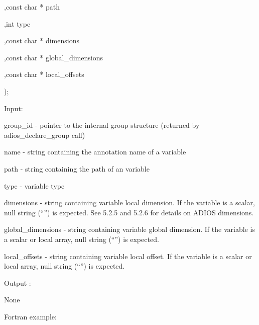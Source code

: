 \vspace{10pt}
\parindent=122pt
,const char * path

\vspace{10pt}
\parindent=151pt
,int type

\vspace{10pt}
,const char * dimensions

\vspace{10pt}
\parindent=302pt
,const char * global\_dimensions

\vspace{10pt}
\parindent=151pt
,const char * local\_offsets

\vspace{10pt}
);

\vspace{10pt}
Input: 

\vspace{10pt}
\leftskip=40pt
\parindent=0pt
group\_id - pointer to the internal group structure (returned by adios\_declare\_group 
call)

\vspace{10pt}
name - string containing the annotation name of a variable

\vspace{10pt}
path - string containing the path of an variable 

\vspace{10pt}
type - variable type 

\vspace{10pt}
dimensions - string containing variable local dimension. If the variable is a scalar, 
null string (``'') is expected. See 5.2.5 and 5.2.6 for details on ADIOS dimensions.

\vspace{10pt}
global\_dimensions - string containing variable global dimension. If the variable 
is a scalar or local array, null string (``'') is expected.

\vspace{10pt}
local\_offsets - string containing variable local offset. If the variable is a 
scalar or local array, null string (``'') is expected.

\vspace{22pt}
\parindent=-18pt
Output :

\vspace{10pt}
\leftskip=0pt
\parindent=18pt
None

\vspace{22pt}
\leftskip=22pt
\parindent=0pt
Fortran example: 

